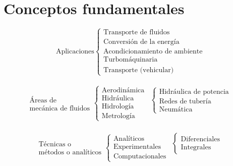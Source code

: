 \section{Conceptos fundamentales}

\[
    \text{Aplicaciones}
    \left\{
        \begin{array}{l}
            \text{Transporte de fluidos} \\
            \text{Conversión de la energía} \\
            \text{Acondicionamiento de ambiente} \\
            \text{Turbomáquinaria} \\
            \text{Transporte (vehicular)} 
        \end{array}
    \right.
\]

\[
    \begin{array}{c}
         \text{Áreas de}  \\
         \text{mecánica de fluidos}
    \end{array}
    \left\{ 
        \begin{array}{l}
             \text{Aerodinámica} \\
             \text{Hidráulica} \\ 
             \text{Hidrología} \\
             \text{Metrología}
        \end{array}
    \right.    
    \begin{array}{l}
        \\
        \left\{
            \begin{array}{l}
                \text{Hidráulica de potencia} \\
                \text{Redes de tubería} \\
                \text{Neumática}
            \end{array}
        \right. \\
        \\
        \\
    \end{array}
\]

\[
    \begin{array}{c}
         \text{Técnicas o}  \\
         \text{métodos o analíticos}
    \end{array}
    \left\{ 
        \begin{array}{l}
             \text{Analíticos} \\
             \text{Experimentales} \\ 
             \text{Computacionales} 
        \end{array}
    \right.    
    \begin{array}{l}
        \left\{
            \begin{array}{l}
                \text{Diferenciales} \\
                \text{Integrales} 
            \end{array}
        \right.\\
        \\
        \\
    \end{array}
\]


